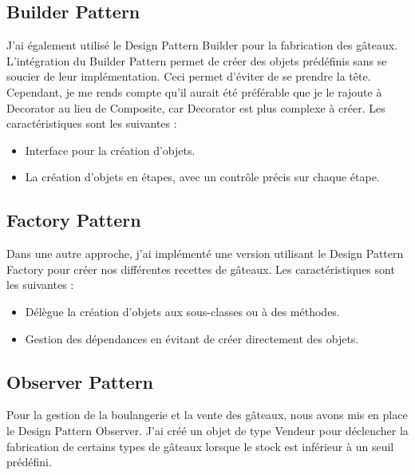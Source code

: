 \documentclass{article}
\begin{document}
\subsection{Builder Pattern}

J'ai également utilisé le Design Pattern Builder pour la fabrication des gâteaux. L'intégration du Builder Pattern permet de créer des objets prédéfinis sans se soucier de leur implémentation. Ceci permet d'éviter de se prendre la tête. Cependant, je me rends compte qu'il aurait été préférable que je le rajoute à Decorator au lieu de Composite, car Decorator est plus complexe à créer. Les caractéristiques sont les suivantes :
\begin{itemize}
\item Interface pour la création d'objets.
\item La création d'objets en étapes, avec un contrôle précis sur chaque étape.
\end{itemize}

\subsection{Factory Pattern}

Dans une autre approche, j'ai implémenté une version utilisant le Design Pattern Factory pour créer nos différentes recettes de gâteaux. Les caractéristiques sont les suivantes :
\begin{itemize}
\item Délègue la création d'objets aux sous-classes ou à des méthodes.
\item Gestion des dépendances en évitant de créer directement des objets.
\end{itemize}

\subsection{Observer Pattern}

Pour la gestion de la boulangerie et la vente des gâteaux, nous avons mis en place le Design Pattern Observer. J'ai créé un objet de type Vendeur pour déclencher la fabrication de certains types de gâteaux lorsque le stock est inférieur à un seuil prédéfini.
\end{document}

